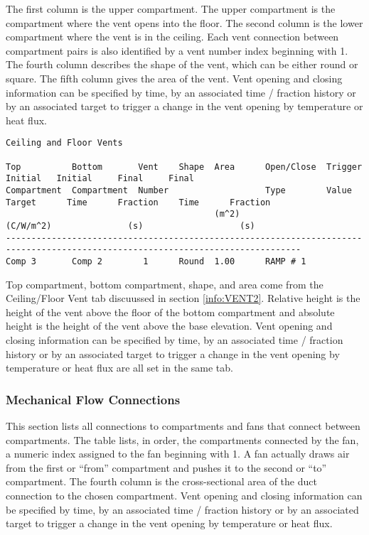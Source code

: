 The first column is the upper compartment.  The upper compartment is the compartment where the vent opens into the floor.  The second column is the lower compartment where the vent is in the ceiling. Each vent connection between compartment pairs is also identified by a vent number index beginning with 1. The fourth column describes the shape of the vent, which can be either round or square.  The fifth column gives the area of the vent. Vent opening and closing information can be specified by time, by an associated time / fraction history or by an associated target to trigger a change in the vent opening by temperature or heat flux.
\newpage
\begin{lstlisting}[basicstyle=\tiny]
Ceiling and Floor Vents

Top          Bottom       Vent    Shape  Area      Open/Close  Trigger                 Initial   Initial     Final     Final
Compartment  Compartment  Number                   Type        Value       Target      Time      Fraction    Time      Fraction
                                         (m^2)                 (C/W/m^2)               (s)                   (s)
--------------------------------------------------------------------------------------------------------------------------------
Comp 3       Comp 2        1      Round  1.00      RAMP # 1
\end{lstlisting}
Top compartment, bottom compartment, shape, and area come from the Ceiling/Floor Vent tab discuussed in section \ref{info:VENT2}. Relative height is the height of the vent above the floor of the bottom compartment and absolute height is the height of the vent above the base elevation.  Vent opening and closing information can be specified by time, by an associated time / fraction history or by an associated target to trigger a change in the vent opening by temperature or heat flux are all set in the same tab.

\subsubsection{Mechanical Flow Connections}

This section lists all connections to compartments and fans that connect between compartments. The table lists, in order, the compartments connected by the fan, a numeric index assigned to the fan beginning with 1.  A fan actually draws air from the first or ``from'' compartment and pushes it to the second or ``to'' compartment. The fourth column is the cross-sectional area of the duct connection to the chosen compartment. Vent opening and closing information can be specified by time, by an associated time / fraction history or by an associated target to trigger a change in the vent opening by temperature or heat flux.

